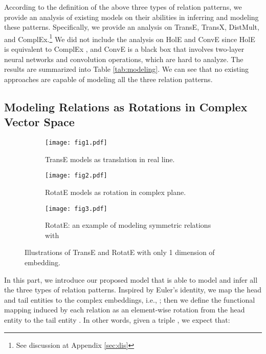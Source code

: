 \documentclass{article} \usepackage{iclr2019_conference,times}
\def\method{RotatE}
\begin{document}
According to the definition of the above three types of relation patterns, we provide an analysis of existing models on their abilities in inferring and modeling these patterns. Specifically, we provide an analysis on TransE, TransX, DistMult, and ComplEx.\footnote{See discussion at Appendix \ref{sec:dis}} We did not include the analysis on HolE and ConvE since HolE is equivalent to ComplEx  \citep{hayashi2017equivalence}, and ConvE is a black box that involves two-layer neural networks and convolution operations, which are hard to analyze. The results are summarized into Table \ref{tab:modeling}.
We can see that no existing approaches are capable of modeling all the three relation patterns. 

\subsection{Modeling Relations as Rotations in Complex Vector Space}

\begin{figure}[t]
\centering
\begin{subfigure}{.3\textwidth}
  \centering
  \captionsetup{width=.8\linewidth}
  \texttt{[image: fig1.pdf]}
  \caption{TransE models  as translation in real line.}
  \label{fig:1}
\end{subfigure}\begin{subfigure}{.3\textwidth}
  \centering
  \captionsetup{width=.8\linewidth}
  \texttt{[image: fig2.pdf]}
  \caption{\method{} models  as rotation in complex plane.}
  \label{fig:4}
\end{subfigure}
\begin{subfigure}{.3\textwidth}
  \centering
  \captionsetup{width=.8\linewidth}
  \texttt{[image: fig3.pdf]}
  \caption{RotatE: an example of modeling symmetric relations  with }
  \label{fig:3}
\end{subfigure}
\caption{Illustrations of TransE and \method{} with only 1 dimension of embedding.}
\label{fig:fig}
\end{figure}

In this part, we introduce our proposed model that is able to model and infer all the three types of relation patterns. Inspired by Euler's identity, we map the head and tail entities  to the complex embeddings, i.e., ;
then we define the functional mapping induced by each relation  as  an element-wise rotation from the head entity  to the tail entity . In other words, given a triple , we expect that:
\end{document}
